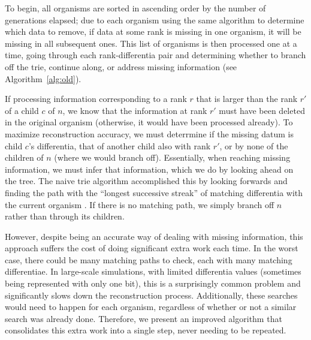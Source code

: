 To begin, all organisms are sorted in ascending order by the number of generations elapsed; due to each organism using the same algorithm to determine which data to remove, if data at some rank is missing in one organism, it will be missing in all subsequent ones. This list of organisms is then processed one at a time, going through each rank-differentia pair and determining whether to branch off the trie, continue along, or address missing information (see Algorithm~\ref{alg:old}). 

If processing information corresponding to a rank $r$ that is larger than the rank $r'$ of a child $c$ of $n$, we know that the information at rank $r'$ must have been deleted in the original organism (otherwise, it would have been processed already). To maximize reconstruction accuracy, we must deterrmine if the missing datum is child $c$'s differentia, that of another child also with rank $r'$, or by none of the children of $n$ (where we would branch off). Essentially, when reaching missing information, we must infer that information, which we do by looking ahead on the tree. The naive  trie algorithm accomplished this by looking forwards and finding the path with the ``longest successive streak'' of matching differentia with the current organism \citep{moreno2024analysis}. If there is no matching path, we simply branch off $n$ rather than through its children.



However, despite being an accurate way of dealing with missing information, this approach suffers the cost of doing significant extra work each time. In the worst case, there could be many matching paths to check, each with many matching differentiae. In large-scale simulations, with limited differentia values (sometimes being represented with only one bit), this is a surprisingly common problem and significantly slows down the reconstruction process. Additionally, these searches would need to happen for each organism, regardless of whether or not a similar search was already done. Therefore, we present an improved algorithm that consolidates this extra work into a single step, never needing to be repeated.
